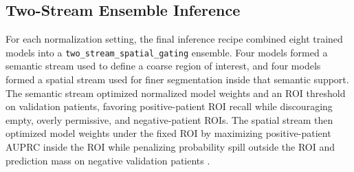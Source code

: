 \documentclass[a4paper,fleqn]{cas-dc}
\newcommand{\TwoStreamSpatialGating}{\texttt{two\_\allowbreak stream\_\allowbreak spatial\_\allowbreak gating}}
\begin{document}
\subsection{Two-Stream Ensemble Inference}

For each normalization setting, the final inference recipe combined eight trained models into a \TwoStreamSpatialGating{} ensemble. Four models formed a semantic stream used to define a coarse region of interest, and four models formed a spatial stream used for finer segmentation inside that semantic support. The semantic stream optimized normalized model weights and an ROI threshold on validation patients, favoring positive-patient ROI recall while discouraging empty, overly permissive, and negative-patient ROIs. The spatial stream then optimized model weights under the fixed ROI by maximizing positive-patient AUPRC inside the ROI while penalizing probability spill outside the ROI and prediction mass on negative validation patients \cite{akiba2019optuna,bergstra2011algorithms,saito2015precision}.
\end{document}
